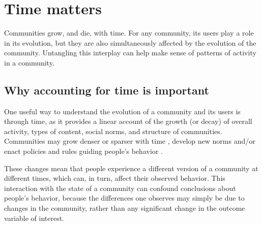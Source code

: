 \section{Time matters} 

Communities grow, and die, with time. For any community, its users play a role in its evolution, but they are also simultaneously affected by the evolution of the community. Untangling this interplay can help make sense of patterns of activity in a community.



\subsection{Why accounting for time is important}
One useful way to understand the evolution of a community and its users is through time, as it provides a linear account of the growth (or decay) of overall activity, types of content, social norms, and structure of communities. Communities may grow denser or sparser with time \cite{Leskovec2005}, develop new norms \cite{Kooti2011} and/or enact policies and rules guiding people's behavior \cite{Butler2008}.

These changes mean that people experience a different version of a community at different times, which can, in turn, affect their observed behavior. This interaction with the state of a community can confound conclusions about people's behavior, because the differences one observes may simply be due to changes in the community, rather than any significant change in the outcome variable of interest.  

